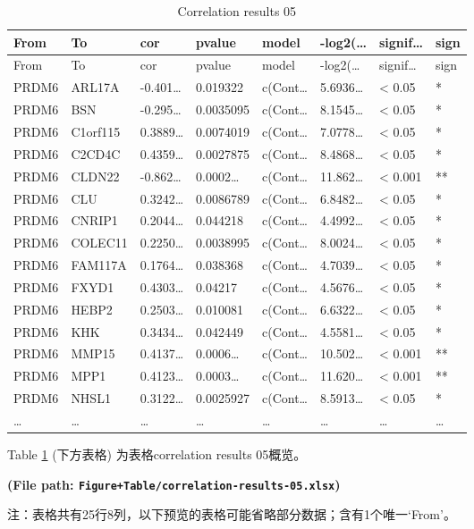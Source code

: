 \documentclass[
]{article}
\begin{document}
\begin{longtable}[]{@{}llllllll@{}}
\caption{\label{tab:correlation-results-05}Correlation results 05}\tabularnewline
\toprule
From & To & cor & pvalue & model & -log2(\ldots{} & signif\ldots{} & sign\tabularnewline
\midrule
\endfirsthead
\toprule
From & To & cor & pvalue & model & -log2(\ldots{} & signif\ldots{} & sign\tabularnewline
\midrule
\endhead
PRDM6 & ARL17A & -0.401\ldots{} & 0.019322 & c(Cont\ldots{} & 5.6936\ldots{} & \textless{} 0.05 & *\tabularnewline
PRDM6 & BSN & -0.295\ldots{} & 0.0035095 & c(Cont\ldots{} & 8.1545\ldots{} & \textless{} 0.05 & *\tabularnewline
PRDM6 & C1orf115 & 0.3889\ldots{} & 0.0074019 & c(Cont\ldots{} & 7.0778\ldots{} & \textless{} 0.05 & *\tabularnewline
PRDM6 & C2CD4C & 0.4359\ldots{} & 0.0027875 & c(Cont\ldots{} & 8.4868\ldots{} & \textless{} 0.05 & *\tabularnewline
PRDM6 & CLDN22 & -0.862\ldots{} & 0.0002\ldots{} & c(Cont\ldots{} & 11.862\ldots{} & \textless{} 0.001 & **\tabularnewline
PRDM6 & CLU & 0.3242\ldots{} & 0.0086789 & c(Cont\ldots{} & 6.8482\ldots{} & \textless{} 0.05 & *\tabularnewline
PRDM6 & CNRIP1 & 0.2044\ldots{} & 0.044218 & c(Cont\ldots{} & 4.4992\ldots{} & \textless{} 0.05 & *\tabularnewline
PRDM6 & COLEC11 & 0.2250\ldots{} & 0.0038995 & c(Cont\ldots{} & 8.0024\ldots{} & \textless{} 0.05 & *\tabularnewline
PRDM6 & FAM117A & 0.1764\ldots{} & 0.038368 & c(Cont\ldots{} & 4.7039\ldots{} & \textless{} 0.05 & *\tabularnewline
PRDM6 & FXYD1 & 0.4303\ldots{} & 0.04217 & c(Cont\ldots{} & 4.5676\ldots{} & \textless{} 0.05 & *\tabularnewline
PRDM6 & HEBP2 & 0.2503\ldots{} & 0.010081 & c(Cont\ldots{} & 6.6322\ldots{} & \textless{} 0.05 & *\tabularnewline
PRDM6 & KHK & 0.3434\ldots{} & 0.042449 & c(Cont\ldots{} & 4.5581\ldots{} & \textless{} 0.05 & *\tabularnewline
PRDM6 & MMP15 & 0.4137\ldots{} & 0.0006\ldots{} & c(Cont\ldots{} & 10.502\ldots{} & \textless{} 0.001 & **\tabularnewline
PRDM6 & MPP1 & 0.4123\ldots{} & 0.0003\ldots{} & c(Cont\ldots{} & 11.620\ldots{} & \textless{} 0.001 & **\tabularnewline
PRDM6 & NHSL1 & 0.3122\ldots{} & 0.0025927 & c(Cont\ldots{} & 8.5913\ldots{} & \textless{} 0.05 & *\tabularnewline
\ldots{} & \ldots{} & \ldots{} & \ldots{} & \ldots{} & \ldots{} & \ldots{} & \ldots{}\tabularnewline
\bottomrule
\end{longtable}

Table \ref{tab:correlation-results-05} (下方表格) 为表格correlation results 05概览。

\textbf{(File path: \texttt{Figure+Table/correlation-results-05.xlsx})}

\begin{center}\begin{tcolorbox}[colback=gray!10, colframe=gray!50, width=0.9\linewidth, arc=1mm, boxrule=0.5pt]注：表格共有25行8列，以下预览的表格可能省略部分数据；含有1个唯一`From'。
\end{tcolorbox}
\end{center}
\end{document}
